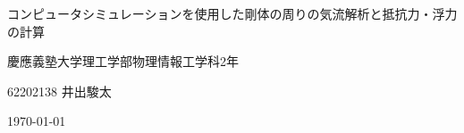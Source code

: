 \documentclass[main]{subfiles}
\begin{document}
\begin{titlepage}
    \centering
    \Large
    コンピュータシミュレーションを使用した剛体の周りの気流解析と抵抗力・浮力の計算
    
    \normalsize
    \vspace{10pt}
    慶應義塾大学理工学部物理情報工学科2年

    62202138 井出駿太

    \vspace{10pt}
    \today

\end{titlepage}
\end{document}
